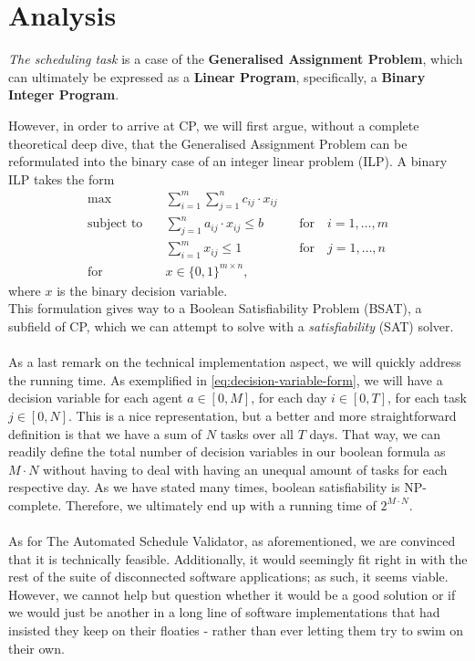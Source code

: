 \section{Analysis}
\textit{The scheduling task} is a case of the \textbf{Generalised Assignment Problem}\cite{Wiki-general-assignment-prob}, which can ultimately be expressed as a \textbf{Linear Program}\cite{Wiki-linear-programming}, specifically, a \textbf{Binary Integer Program}.

However, in order to arrive at CP, we will first argue, without a complete theoretical deep dive, that the Generalised Assignment Problem can be reformulated into the binary case of an integer linear problem (ILP). A binary ILP takes the form\cite{Integer-Programming-Book} 
\begin{align*}
    \text{max} \quad &\sum_{i = 1}^m \sum_{j = 1}^n c_{ij} \cdot x_{ij}
    \\
    \text{subject to} \quad &\sum_{j = 1}^n a_{ij} \cdot x_{ij} \leq b \qquad &\text{for} \quad i = 1, \hdots, m
    \\
    &\sum_{i = 1}^m x_{ij} \leq 1 \qquad &\text{for} \quad j = 1, \hdots, n
    \\
    \text{for} \quad &x \in \{0, 1\}^{m \times n},
\end{align*}
where $x$ is the binary decision variable.
\\
This formulation gives way to a Boolean Satisfiability Problem (BSAT), a subfield of CP, which we can attempt to solve with a \textit{satisfiability} (SAT) solver.
\\
\\
As a last remark on the technical implementation aspect, we will quickly address the running time. As exemplified in \autoref{eq:decision-variable-form}, we will have a decision variable for each agent \(a \in [0, M]\), for each day \(i \in [0, T]\), for each task \(j \in [0, N]\). This is a nice representation, but a better and more straightforward definition is that we have a sum of \(N\) tasks over all \(T\) days. That way, we can readily define the total number of decision variables in our boolean formula as \(M \cdot N\) without having to deal with having an unequal amount of tasks for each respective day. As we have stated many times, boolean satisfiability is NP-complete. Therefore, we ultimately end up with a running time of \(2^{M \cdot N}\).
\\
\\
As for The Automated Schedule Validator, as aforementioned, we are convinced that it is technically feasible. Additionally, it would seemingly fit right in with the rest of the suite of disconnected software applications; as such, it seems viable. However, we cannot help but question whether it would be a good solution or if we would just be another in a long line of software implementations that had insisted they keep on their floaties - rather than ever letting them try to swim on their own.